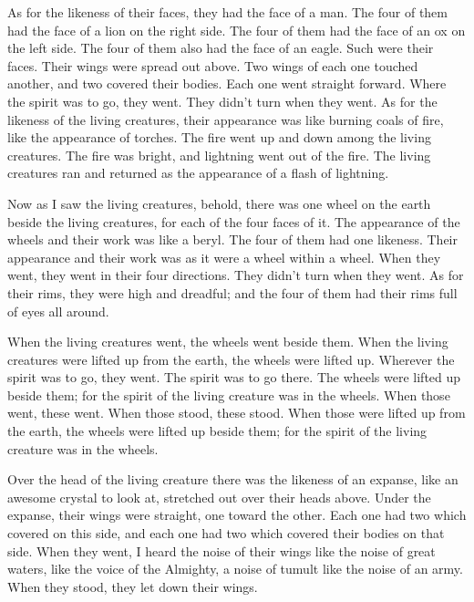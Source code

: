 \myverse{}As for the likeness of their faces, they had the face of a man.
The four of them had the face of a lion on the right side. The four of them had the face of an ox on the
left side. The four of them also had the face of an eagle.
\myverse{}Such were their faces. Their wings were spread out above. Two wings of each
one touched another, and two covered their bodies.
\myverse{}Each one went straight forward. Where the spirit was to go, they went. They
didn’t turn when they went.
\myverse{}As for the likeness of the living creatures, their appearance was like burning
coals of fire, like the appearance of torches. The fire went up and down among the living creatures. The
fire was bright, and lightning went out of the fire.
\myverse{}The living creatures ran and returned as the appearance of a flash of lightning.

\myverse{}Now as I saw the living creatures, behold, there was one wheel
on the earth beside the living creatures, for each of the four faces of it.
\myverse{}The appearance of the wheels and their work was like a beryl. The four of
them had one likeness. Their appearance and their work was as it were a wheel within a wheel.
\myverse{}When they went, they went in their four directions. They didn’t turn when
they went.
\myverse{}As for their rims, they were high and dreadful; and the four of them had their
rims full of eyes all around.

\myverse{}When the living creatures went, the wheels went beside them.
When the living creatures were lifted up from the earth, the wheels were lifted up.
\myverse{}Wherever the spirit was to go, they went. The spirit was to go there. The
wheels were lifted up beside them; for the spirit of the living creature was in the wheels.
\myverse{}When those went, these went. When those stood, these stood. When those were
lifted up from the earth, the wheels were lifted up beside them; for the spirit of the living creature
was in the wheels.

\myverse{}Over the head of the living creature there was the likeness of
an expanse, like an awesome crystal to look at, stretched out over their heads above.
\myverse{}Under the expanse, their wings were straight, one toward the other. Each one
had two which covered on this side, and each one had two which covered their bodies on that side.
\myverse{}When they went, I heard the noise of their wings like the noise of great waters,
like the voice of the Almighty, a noise of tumult like the noise of an army. When they stood, they let
down their wings.

